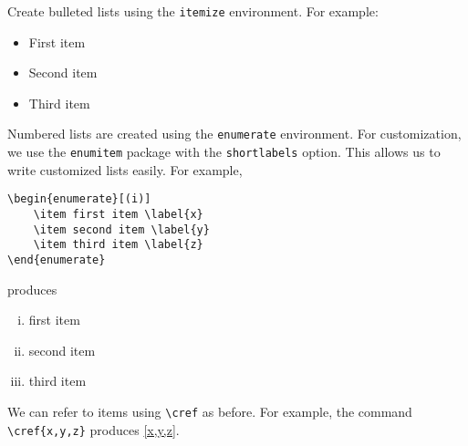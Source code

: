 Create bulleted lists using the \verb|itemize| environment. For example:
\begin{itemize}
	\item First item
	\item Second item
	\item Third item
\end{itemize}
Numbered lists are created using the \verb|enumerate| environment. For customization, we use the \verb|enumitem| package with the \verb|shortlabels| option. This allows us to write customized lists easily. For example,
\bigskip

\hfill
\begin{minipage}{0.45\linewidth}
\begin{verbatim}
\begin{enumerate}[(i)]
    \item first item \label{x}
    \item second item \label{y}
    \item third item \label{z}
\end{enumerate}
\end{verbatim}
\end{minipage}
\hfill produces \hfill
\begin{minipage}{0.3\linewidth}
\begin{enumerate}[(i)]
	\item first item \label{x}
	\item second item \label{y}
 	\item third item \label{z}
\end{enumerate}
\end{minipage}
\bigskip

We can refer to items using \verb|\cref| as before. For example, the command \verb|\cref{x,y,z}| produces \cref{x,y,z}.